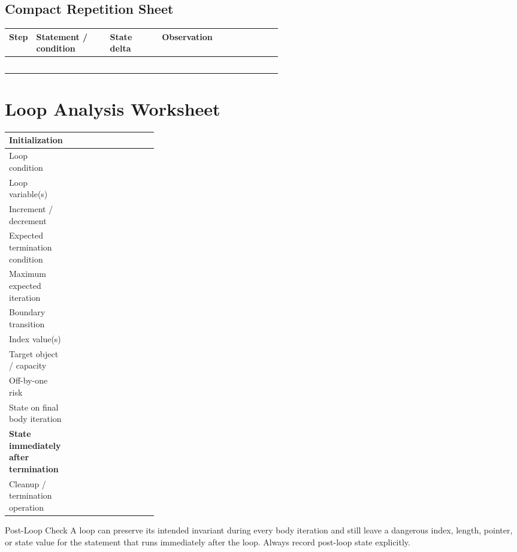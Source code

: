 \documentclass[10pt]{article}
\begin{document}
\subsection{Compact Repetition Sheet}
\par\smallskip\noindent\begin{tabularx}{\linewidth}{@{}C{0.07\linewidth}L{0.27\linewidth}L{0.19\linewidth}Y@{}}
\toprule
Step & Statement / condition & State delta & Observation \\
\midrule
\rule{0pt}{2.5em} & & & \\
\rule{0pt}{2.5em} & & & \\
\rule{0pt}{2.5em} & & & \\
\rule{0pt}{2.5em} & & & \\
\rule{0pt}{2.5em} & & & \\
\bottomrule
\end{tabularx}

\section{Loop Analysis Worksheet}
\par\smallskip\noindent\begin{tabularx}{\linewidth}{@{}L{0.29\linewidth}Y@{}}
Initialization & \\ \midrule
Loop condition & \\ \midrule
Loop variable(s) & \\ \midrule
Increment / decrement & \\ \midrule
Expected termination condition & \\ \midrule
Maximum expected iteration & \\ \midrule
Boundary transition & \\ \midrule
Index value(s) & \\ \midrule
Target object / capacity & \\ \midrule
Off-by-one risk & \\ \midrule
State on final body iteration & \\ \midrule
\textbf{State immediately after termination} & \\ \midrule
Cleanup / termination operation & \\ 
\end{tabularx}

\begin{cautionbox}{Post-Loop Check}
A loop can preserve its intended invariant during every body iteration and still leave a dangerous index, length, pointer, or state value for the statement that runs immediately after the loop. Always record post-loop state explicitly.
\end{cautionbox}
\end{document}
